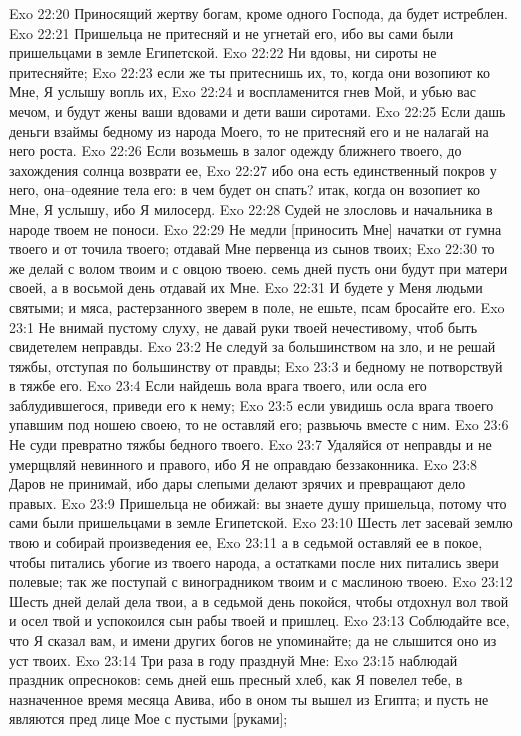 Exo 22:20  Приносящий жертву богам, кроме одного Господа, да будет истреблен.
Exo 22:21  Пришельца не притесняй и не угнетай его, ибо вы сами были пришельцами в земле Египетской.
Exo 22:22  Ни вдовы, ни сироты не притесняйте;
Exo 22:23  если же ты притеснишь их, то, когда они возопиют ко Мне, Я услышу вопль их,
Exo 22:24  и воспламенится гнев Мой, и убью вас мечом, и будут жены ваши вдовами и дети ваши сиротами.
Exo 22:25  Если дашь деньги взаймы бедному из народа Моего, то не притесняй его и не налагай на него роста.
Exo 22:26  Если возьмешь в залог одежду ближнего твоего, до захождения солнца возврати ее,
Exo 22:27  ибо она есть единственный покров у него, она--одеяние тела его: в чем будет он спать? итак, когда он возопиет ко Мне, Я услышу, ибо Я милосерд.
Exo 22:28  Судей не злословь и начальника в народе твоем не поноси.
Exo 22:29  Не медли [приносить Мне] начатки от гумна твоего и от точила твоего; отдавай Мне первенца из сынов твоих;
Exo 22:30  то же делай с волом твоим и с овцою твоею. семь дней пусть они будут при матери своей, а в восьмой день отдавай их Мне.
Exo 22:31  И будете у Меня людьми святыми; и мяса, растерзанного зверем в поле, не ешьте, псам бросайте его.
Exo 23:1  Не внимай пустому слуху, не давай руки твоей нечестивому, чтоб быть свидетелем неправды.
Exo 23:2  Не следуй за большинством на зло, и не решай тяжбы, отступая по большинству от правды;
Exo 23:3  и бедному не потворствуй в тяжбе его.
Exo 23:4  Если найдешь вола врага твоего, или осла его заблудившегося, приведи его к нему;
Exo 23:5  если увидишь осла врага твоего упавшим под ношею своею, то не оставляй его; развьючь вместе с ним.
Exo 23:6  Не суди превратно тяжбы бедного твоего.
Exo 23:7  Удаляйся от неправды и не умерщвляй невинного и правого, ибо Я не оправдаю беззаконника.
Exo 23:8  Даров не принимай, ибо дары слепыми делают зрячих и превращают дело правых.
Exo 23:9  Пришельца не обижай: вы знаете душу пришельца, потому что сами были пришельцами в земле Египетской.
Exo 23:10  Шесть лет засевай землю твою и собирай произведения ее,
Exo 23:11  а в седьмой оставляй ее в покое, чтобы питались убогие из твоего народа, а остатками после них питались звери полевые; так же поступай с виноградником твоим и с маслиною твоею.
Exo 23:12  Шесть дней делай дела твои, а в седьмой день покойся, чтобы отдохнул вол твой и осел твой и успокоился сын рабы твоей и пришлец.
Exo 23:13  Соблюдайте все, что Я сказал вам, и имени других богов не упоминайте; да не слышится оно из уст твоих.
Exo 23:14  Три раза в году празднуй Мне:
Exo 23:15  наблюдай праздник опресноков: семь дней ешь пресный хлеб, как Я повелел тебе, в назначенное время месяца Авива, ибо в оном ты вышел из Египта; и пусть не являются пред лице Мое с пустыми [руками];
